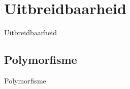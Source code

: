 \documentclass[t]{beamer}
\begin{document}
\section{Uitbreidbaarheid}
\begin{frame}{Uitbreidbaarheid}
\begin{multicols}{2}
\tableofcontents[currentsection]
\end{multicols}
\end{frame}

\subsection{Polymorfisme}
\begin{frame}{Polymorfisme}

\end{frame}
\end{document}
